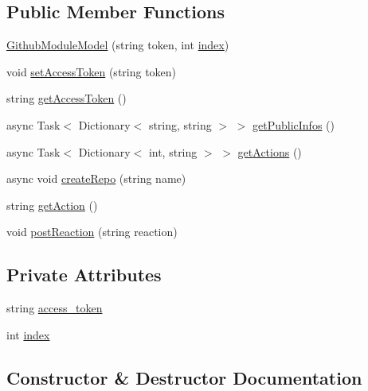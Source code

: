 \subsection*{Public Member Functions}
\begin{DoxyCompactItemize}
\item 
\mbox{\hyperlink{classArea_1_1Models_1_1GithubModuleModel_a33a887e8a0eef8e83cf284f573376e0c}{Github\+Module\+Model}} (string token, int \mbox{\hyperlink{classArea_1_1Models_1_1GithubModuleModel_a6264559445da398186a78c81b0ad0a06}{index}})
\item 
void \mbox{\hyperlink{classArea_1_1Models_1_1GithubModuleModel_a71c393a20452dff06a57b49b97a50e0d}{set\+Access\+Token}} (string token)
\item 
string \mbox{\hyperlink{classArea_1_1Models_1_1GithubModuleModel_ac7ee8eda979a73d787ca6418320822be}{get\+Access\+Token}} ()
\item 
async Task$<$ Dictionary$<$ string, string $>$ $>$ \mbox{\hyperlink{classArea_1_1Models_1_1GithubModuleModel_a39fa05affc8836f1f10d7b95a0c0669a}{get\+Public\+Infos}} ()
\item 
async Task$<$ Dictionary$<$ int, string $>$ $>$ \mbox{\hyperlink{classArea_1_1Models_1_1GithubModuleModel_af3b210b6f977264dfdf3dfb1bf56cb1a}{get\+Actions}} ()
\item 
async void \mbox{\hyperlink{classArea_1_1Models_1_1GithubModuleModel_a1c4790c05ecfacd3d4979d4817b201d8}{create\+Repo}} (string name)
\item 
string \mbox{\hyperlink{classArea_1_1Models_1_1GithubModuleModel_aebec4ccbd02441daa062ce936a9f4e3d}{get\+Action}} ()
\item 
void \mbox{\hyperlink{classArea_1_1Models_1_1GithubModuleModel_aeeda0ad6ec3b9ddaa5a38e9b8a2ef020}{post\+Reaction}} (string reaction)
\end{DoxyCompactItemize}
\subsection*{Private Attributes}
\begin{DoxyCompactItemize}
\item 
string \mbox{\hyperlink{classArea_1_1Models_1_1GithubModuleModel_aae14b69d8630f1c9dfbf04ee3763e31b}{access\+\_\+token}}
\item 
int \mbox{\hyperlink{classArea_1_1Models_1_1GithubModuleModel_a6264559445da398186a78c81b0ad0a06}{index}}
\end{DoxyCompactItemize}


\subsection{Constructor \& Destructor Documentation}
\mbox{\label{classArea_1_1Models_1_1GithubModuleModel_a33a887e8a0eef8e83cf284f573376e0c}} 
